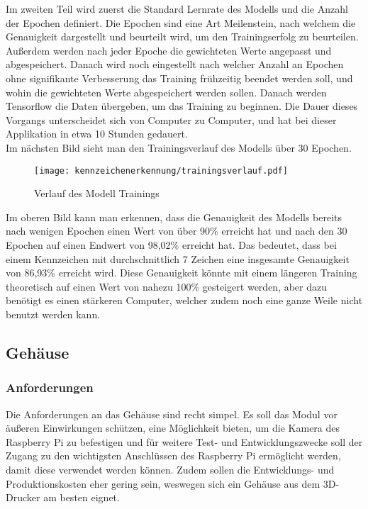 Im zweiten Teil wird zuerst die Standard Lernrate des Modells und die Anzahl der Epochen definiert. Die Epochen sind eine Art Meilenstein, 
nach welchem die Genauigkeit dargestellt und beurteilt wird, um den Trainingserfolg zu beurteilen. Außerdem werden nach jeder Epoche die gewichteten Werte 
angepasst und abgespeichert. Danach wird noch eingestellt nach welcher Anzahl an Epochen ohne signifikante Verbesserung das Training frühzeitig 
beendet werden soll, und wohin die gewichteten Werte abgespeichert werden sollen. Danach werden Tensorflow die Daten übergeben, um das Training 
zu beginnen. Die Dauer dieses Vorgangs unterscheidet sich von Computer zu Computer, und hat bei dieser Applikation in etwa 10 Stunden gedauert.\\

Im nächsten Bild sieht man den Trainingsverlauf des Modells über 30 Epochen.

\begin{figure}[H]
    \centering
    \texttt{[image: kennzeichenerkennung/trainingsverlauf.pdf]}
    \caption{Verlauf des Modell Trainings}
\end{figure}

Im oberen Bild kann man erkennen, dass die Genauigkeit des Modells bereits nach wenigen Epochen einen Wert von über 90\% erreicht hat und 
nach den 30 Epochen auf einen Endwert von 98,02\% erreicht hat. Das bedeutet, dass bei einem Kennzeichen mit durchschnittlich 7 Zeichen 
eine insgesamte Genauigkeit von 86,93\% erreicht wird. Diese Genauigkeit könnte mit einem längeren Training theoretisch auf einen Wert von 
nahezu 100\% gesteigert werden, aber dazu benötigt es einen stärkeren Computer, welcher zudem noch eine ganze Weile nicht benutzt werden kann.

\subsection{Gehäuse}

\subsubsection{Anforderungen}
Die Anforderungen an das Gehäuse sind recht simpel. Es soll das Modul vor äußeren Einwirkungen schützen, eine Möglichkeit bieten, 
um die Kamera des Raspberry Pi zu befestigen und für weitere Test- und Entwicklungszwecke soll der Zugang zu den wichtigsten Anschlüssen des Raspberry Pi ermöglicht werden, damit diese verwendet werden können. Zudem sollen die Entwicklungs- und Produktionskosten eher gering sein, weswegen sich ein 
Gehäuse aus dem 3D-Drucker am besten eignet.


